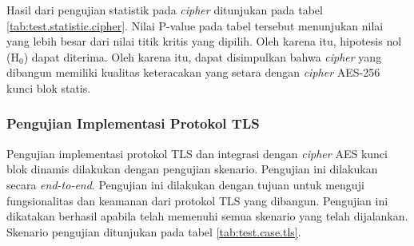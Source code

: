Hasil dari pengujian statistik pada \emph{cipher} ditunjukan pada tabel \ref{tab:test.statistic.cipher}. Nilai P-value pada tabel tersebut menunjukan nilai yang lebih besar dari nilai titik kritis yang dipilih. Oleh karena itu, hipotesis nol ($\text{H}_0$) dapat diterima. Oleh karena itu, dapat disimpulkan bahwa \emph{cipher} yang dibangun memiliki kualitas keteracakan yang setara dengan \emph{cipher} AES-256 kunci blok statis.

\subsubsection{Pengujian Implementasi Protokol TLS}

Pengujian implementasi protokol TLS dan integrasi dengan \emph{cipher} AES kunci blok dinamis dilakukan dengan pengujian skenario. Pengujian ini dilakukan secara \emph{end-to-end}. Pengujian ini dilakukan dengan tujuan untuk menguji fungsionalitas dan keamanan dari protokol TLS yang dibangun. Pengujian ini dikatakan berhasil apabila telah memenuhi semua skenario yang telah dijalankan. Skenario pengujian ditunjukan pada tabel \ref{tab:test.case.tls}.

